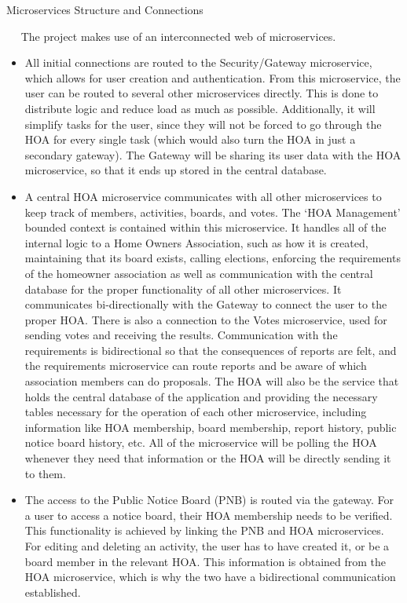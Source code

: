 \documentclass{article}
\begin{document}
\begin{section}{Microservices Structure and Connections}

	$\quad$ The project makes use of an interconnected web of microservices.
    \begin{itemize}
        \item  All initial connections are routed to the Security/Gateway microservice, which allows for user creation and authentication. From this microservice, the user can be routed to several other microservices directly. This is done to distribute logic and reduce load as much as possible. Additionally, it will simplify tasks for the user, since they will not be forced to go through the HOA for every single task (which would also turn the HOA in just a secondary gateway). The Gateway will be sharing its user data with the HOA microservice, so that it ends up stored in the central database.
        \item A central HOA microservice communicates with all other microservices to keep track of members, activities, boards, and votes. The ‘HOA Management’ bounded context is contained within this microservice. It handles all of the internal logic to a Home Owners Association, such as how it is created, maintaining that its board exists, calling elections, enforcing the requirements of the homeowner association as well as communication with the central database for the proper functionality of all other microservices. It communicates bi-directionally with the Gateway to connect the user to the proper HOA. There is also a connection to the Votes microservice, used for sending votes and receiving the results. Communication with the requirements is bidirectional so that the consequences of reports are felt, and the requirements microservice can route reports and be aware of which association members can do proposals. The HOA will also be the service that holds the central database of the application and providing the necessary tables necessary for the operation of each other microservice, including information like HOA membership, board membership, report history, public notice board history, etc. All of the microservice will be polling the HOA whenever they need that information or the HOA will be directly sending it to them.

	\item The access to the Public Notice Board (PNB) is routed via the gateway. For a user to access a notice board, their HOA membership needs to be verified. This functionality is achieved by linking the PNB and HOA microservices. For editing and deleting an activity, the user has to have created it, or be a board member in the relevant HOA. This information is obtained from the HOA microservice, which is why the two have a bidirectional communication established.


\end{itemize}
\end{section}
\end{document}
